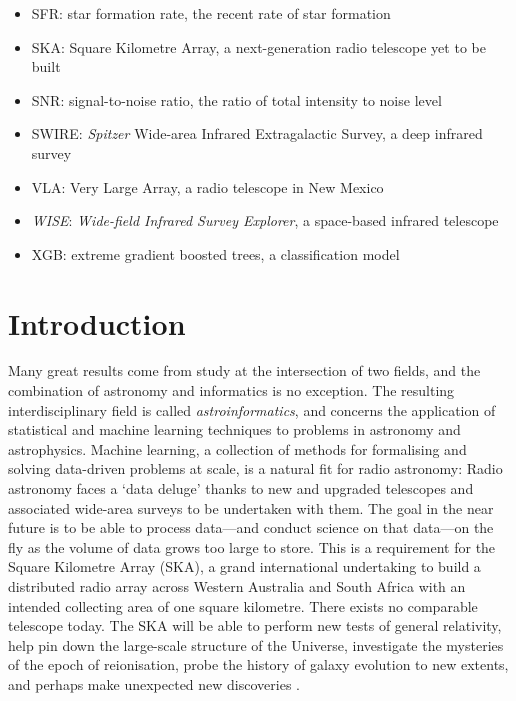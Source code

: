 \documentclass[11pt, a4paper]{book}
\newcommand{\defn}[1]{\emph{#1}}
\begin{document}
\begin{itemize}
    \item SFR: star formation rate, the recent rate of star formation
    \item SKA: Square Kilometre Array, a next-generation radio telescope yet to be built
    \item SNR: signal-to-noise ratio, the ratio of total intensity to noise level
    \item SWIRE: \emph{Spitzer} Wide-area Infrared Extragalactic Survey, a deep infrared survey
    \item VLA: Very Large Array, a radio telescope in New Mexico
    \item \emph{WISE}: \emph{Wide-field Infrared Survey Explorer}, a space-based infrared telescope
    \item XGB: extreme gradient boosted trees, a classification model
\end{itemize}

\mainmatter

\chapter{Introduction}
\label{cha:intro}



Many great results come from study at the intersection of two fields, and the combination of astronomy and informatics is no exception. The resulting interdisciplinary field is called \defn{astroinformatics}, and concerns the application of statistical and machine learning techniques to problems in astronomy and astrophysics.
Machine learning, a collection of methods for formalising and solving data-driven problems at scale, is a natural fit for radio astronomy: Radio astronomy faces a `data deluge' thanks to new and upgraded telescopes and associated wide-area surveys to be undertaken with them. The goal in the near future is to be able to process data---and conduct science on that data---on the fly as the volume of data grows too large to store. This is a requirement for the Square Kilometre Array (SKA), a grand international undertaking to build a distributed radio array across Western Australia and South Africa with an intended collecting area of one square kilometre. There exists no comparable telescope today. The SKA will be able to perform new tests of general relativity, help pin down the large-scale structure of the Universe, investigate the mysteries of the epoch of reionisation, probe the history of galaxy evolution to new extents, and perhaps make unexpected new discoveries \citep{diamond_ska_2017}.
\end{document}
